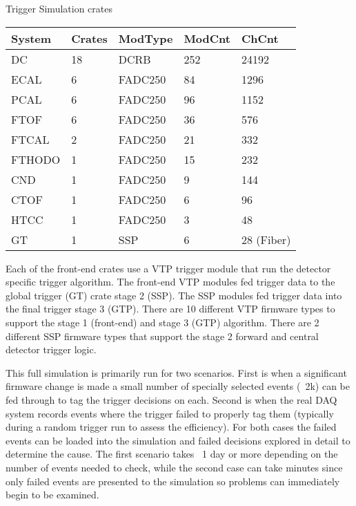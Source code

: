 \begin{center}
	Trigger Simulation crates\\
	\begin{tabular}{| l | l | l | l | l |}
		\hline \hline
		System		& Crates	& ModType	& ModCnt	& ChCnt		\\
		\hline
		DC		& 18		& DCRB		& 252		& 24192		\\
		ECAL		& 6		& FADC250	& 84		& 1296	 	\\
		PCAL		& 6		& FADC250	& 96		& 1152	 	\\
		FTOF		& 6		& FADC250	& 36		& 576	 	\\
		FTCAL		& 2		& FADC250	& 21		& 332	 	\\
		FTHODO		& 1		& FADC250	& 15		& 232	 	\\
		CND		& 1		& FADC250	& 9		& 144	 	\\
		CTOF		& 1		& FADC250	& 6		& 96	 	\\
		HTCC		& 1		& FADC250	& 3		& 48	 	\\
		GT		& 1		& SSP		& 6		& 28 (Fiber)	\\
		\hline \hline
	\end{tabular}
\end{center}

Each of the front-end crates use a VTP trigger module that run the detector specific trigger algorithm. The front-end VTP modules fed trigger data to the global trigger (GT) crate stage 2 (SSP). The SSP modules fed trigger data into the final trigger stage 3 (GTP). There are 10 different VTP firmware types to support the stage 1 (front-end) and stage 3 (GTP) algorithm. There are 2 different SSP firmware types that support the stage 2 forward and central detector trigger logic.

This full simulation is primarily run for two scenarios. First is when a significant firmware change is made a small number of specially selected events (~2k) can be fed through to tag the trigger decisions on each. Second is when the real DAQ system records events where the trigger failed to properly tag them (typically during a random trigger run to assess the efficiency). For both cases the failed events can be loaded into the simulation and failed decisions explored in detail to determine the cause. The first scenario takes ~1 day or more depending on the number of events needed to check, while the second case can take minutes since only failed events are presented to the simulation so problems can immediately begin to be examined.